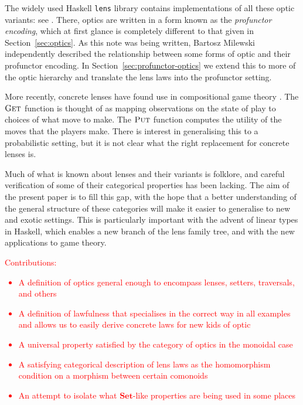 \documentclass[11pt,a4paper]{article}
\theoremstyle{plain}
\theoremstyle{definition}
\newcommand{\lenslib}{\texttt{lens}}
\newcommand{\Set}{\mathbf{Set}}
\newcommand{\fget}{\textsc{Get}}
\newcommand{\fput}{\textsc{Put}}
\newcommand{\todo}[1]{\textcolor{red}{\small #1}}
\begin{document}
The widely used Haskell \lenslib{} library contains implementations of all these optic variants: see \cite{LensLibrary}. There, optics are written in a form known as the \emph{profunctor encoding}, which at first glance is completely different to that given in Section~\ref{sec:optics}. As this note was being written, Bartosz Milewski~\cite{ProfunctorOpticsPost} independently described the relationship between some forms of optic and their profunctor encoding. In Section~\ref{sec:profunctor-optics} we extend this to more of the optic hierarchy and translate the lens laws into the profunctor setting.

More recently, concrete lenses have found use in compositional game theory \cite{CompositionalGameTheory}. The $\fget$ function is thought of as mapping observations on the state of play to choices of what move to make. The $\fput$ function computes the utility of the moves that the players make. There is interest in generalising this to a probabilistic setting, but it is not clear what the right replacement for concrete lenses is.

Much of what is known about lenses and their variants is folklore, and careful verification of some of their categorical properties has been lacking. The aim of the present paper is to fill this gap, with the hope that a better understanding of the general structure of these categories will make it easier to generalise to new and exotic settings. This is particularly important with the advent of linear types in Haskell, which enables a new branch of the lens family tree, and with the new applications to game theory.

\todo{Contributions:
  \begin{itemize}
  \item A definition of optics general enough to encompass lenses, setters, traversals, and others
  \item A definition of lawfulness that specialises in the correct way in all examples and allows us to easily derive concrete laws for new kids of optic
  \item A universal property satisfied by the category of optics in the monoidal case
  \item A satisfying categorical description of lens laws as the homomorphism condition on a morphism between certain comonoids
  \item An attempt to isolate what $\Set$-like properties are being used in some places
  \end{itemize}
}
\end{document}
